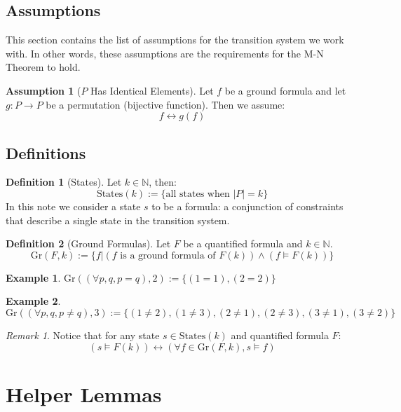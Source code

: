 \documentclass[12pt]{article}
\theoremstyle{definition}
\newtheorem{assumption}{Assumption}
\newtheorem{definition}{Definition}
\newtheorem{example}{Example}
\theoremstyle{remark}
\newtheorem{remark}{Remark}
\newcommand{\states}{\text{States}}
\newcommand{\gr}{\text{Gr}}
\begin{document}
\subsection{Assumptions}
This section contains the list of assumptions for the transition system we work with.  In other words, these assumptions are the requirements for the M-N Theorem to hold.

\begin{assumption}[$P$ Has Identical Elements]
  \label{asmp:ident}
  Let $f$ be a ground formula and let $g : P \to P$ be a permutation (bijective function).  Then we assume:
  $$f \leftrightarrow g(f)$$
\end{assumption}

\subsection{Definitions}
\begin{definition}[States]
  Let $k \in \mathbb{N}$, then:
  $$\states(k) := \{\text{all states when } |P|=k\}$$
  In this note we consider a state $s$ to be a formula: a conjunction of constraints that describe a single state in the transition system.
\end{definition}

\begin{definition}[Ground Formulas]
  Let $F$ be a quantified formula and $k \in \mathbb{N}$.
  $$\gr(F,k) := \{f | (f \text{ is a ground formula of } F(k)) \land (f \models F(k))\}$$
\end{definition}

\begin{example}
  $\gr((\forall p,q, p=q),2) := \{(1=1),(2=2)\}$
\end{example}
\begin{example}
  $\gr((\forall p,q, p \neq q),3) := \{(1 \neq 2),(1 \neq 3),(2 \neq 1),(2 \neq 3),(3 \neq 1),(3 \neq 2)\}$
\end{example}
\begin{remark}
  \label{rmk:pnf-ground}
  Notice that for any state $s \in \states(k)$ and quantified formula $F$:
  $$(s \models F(k)) \leftrightarrow (\forall f \in \gr(F,k), s \models f)$$
\end{remark}



\section{Helper Lemmas}
\end{document}
